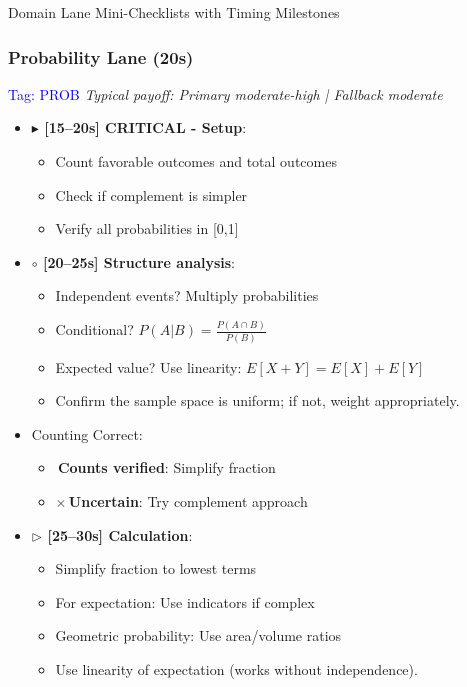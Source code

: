 \documentclass{article}
\begin{document}
\begin{classifybox}{Domain Lane Mini-Checklists with Timing Milestones}
     \subsubsection{Probability Lane (20s)}
     {\footnotesize\textcolor{timegreen}{}}\quad\textcolor{blue}{Tag: PROB}
      \textit{Typical payoff: Primary moderate-high | Fallback moderate}
      \begin{itemize}[nosep]
      \item \textbf{$\blacktriangleright$ [15--20s] CRITICAL - Setup}:
        \begin{itemize}[nosep]
        \item Count favorable outcomes and total outcomes
        \item Check if complement is simpler
        \item Verify all probabilities in [0,1]
        \end{itemize}
      \item \textbf{$\circ$ [20--25s] Structure analysis}:
        \begin{itemize}[nosep]
        \item Independent events? Multiply probabilities
        \item Conditional? $P(A|B) = \frac{P(A \cap B)}{P(B)}$
        \item Expected value? Use linearity: $E[X+Y] = E[X] + E[Y]$
        \item Confirm the sample space is uniform; if not, weight appropriately.
        \end{itemize}
      \item {} Counting Correct:
        \begin{itemize}[nosep]
        \item \checkmark\,\textbf{Counts verified}: Simplify fraction
        \item $\times$\,\textbf{Uncertain}: Try complement approach
        \end{itemize}
      \item \textbf{$\triangleright$ [25--30s] Calculation}:
        \begin{itemize}[nosep]
        \item Simplify fraction to lowest terms
        \item For expectation: Use indicators if complex
        \item Geometric probability: Use area/volume ratios
        \item Use linearity of expectation (works without independence).

\end{itemize}
\end{itemize}
\end{classifybox}
\end{document}

